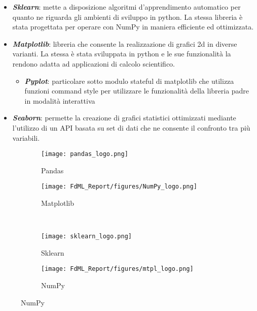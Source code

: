 \documentclass[10pt,a4paper]{article}
\begin{document}
\begin{itemize}
    \item  \textbf{\emph{Sklearn}}: mette a disposizione algoritmi d'apprendimento automatico per quanto ne riguarda gli ambienti di sviluppo in python. La stessa libreria è stata progettata per operare con NumPy in maniera efficiente ed ottimizzata.
\end{itemize}

\begin{itemize}
    \item  \textbf{\emph{Matplotlib}}: libreria che consente la realizzazione di grafici 2d in diverse varianti. La stessa è stata sviluppata in python e le sue funzionalità la rendono adatta ad applicazioni di calcolo scientifico.
    \begin{itemize}
        \item \textbf{\emph{Pyplot}}: particolare sotto modulo stateful di matplotlib che utilizza funzioni command style per utilizzare le funzionalità della libreria padre in modalità interattiva
    \end{itemize}
\end{itemize}

\begin{itemize}
    \item \textbf{\emph{Seaborn}}: permette la creazione di grafici statistici ottimizzati mediante l'utilizzo di un API basata su set di dati che ne consente il confronto tra più variabili.
\end{itemize}

\begin{figure}[ht]
    \centering
    \begin{subfigure}[t]{0.4\textwidth}
        \centering\texttt{[image: pandas\_logo.png]}
        \caption{Pandas}
        \label{fig:multiple:example11}
    \end{subfigure}
    \begin{subfigure}[t]{0.4\textwidth}
        \centering\texttt{[image: FdML\_Report/figures/NumPy\_logo.png]}
        \caption{Matplotlib}
        \label{fig:multiple:example12}
    \end{subfigure}
    \\
    \begin{subfigure}[t]{0.4\textwidth}
        \centering\texttt{[image: sklearn\_logo.png]}
        \caption{Sklearn}
        \label{fig:multiple:example21}
    \end{subfigure}
    \begin{subfigure}[t]{0.4\textwidth}
        \centering\texttt{[image: FdML\_Report/figures/mtpl\_logo.png]}
        \caption{NumPy}
        \label{fig:multiple:example22}
    \end{subfigure}
\end{figure}
\clearpage
\end{document}
